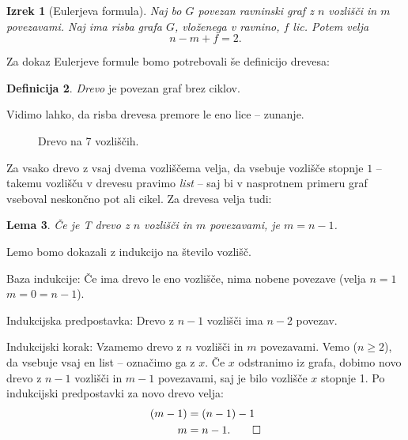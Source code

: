 \documentclass[12pt,a4paper]{amsart}
\theoremstyle{definition} %
\newtheorem{definicija}{Definicija}[section]
\theoremstyle{plain} %
\newtheorem{lema}[definicija]{Lema}
\newtheorem{izrek}[definicija]{Izrek}
\begin{document}
\begin{izrek}[Eulerjeva formula]
    \label{izr:euler-formula}
    Naj bo $G$ povezan ravninski graf z $n$ vozlišči in $m$ povezavami. Naj ima risba grafa $G$, vloženega v ravnino, $f$ lic. Potem velja
    \[ n - m + f = 2 .\]
\end{izrek}

Za dokaz Eulerjeve formule bomo potrebovali še definicijo drevesa:
\begin{definicija}
    \emph{Drevo} je povezan graf brez ciklov.
\end{definicija}
Vidimo lahko, da risba drevesa premore le eno lice -- zunanje.

\begin{figure}[h]
    
    \caption{Drevo na 7 vozliščih.}
\end{figure}

Za vsako drevo z vsaj dvema vozliščema velja, da vsebuje vozlišče stopnje $1$ -- takemu vozlišču v drevesu pravimo \emph{list} -- saj bi v nasprotnem primeru graf vseboval neskončno pot ali cikel. Za drevesa velja tudi:

\begin{lema}
    Če je T drevo z $n$ vozlišči in $m$ povezavami, je $m=n-1$.
\end{lema}

\proof
    Lemo bomo dokazali z indukcijo na število vozlišč.
    
    Baza indukcije: Če ima drevo le eno vozlišče, nima nobene povezave (velja $n = 1$ $m = 0 = n-1$).
    
    Indukcijska predpostavka: Drevo z $n-1$ vozlišči ima $n-2$ povezav.
    
    Indukcijski korak: Vzamemo drevo z $n$ vozlišči in $m$ povezavami. Vemo ($n \geq 2$), da vsebuje vsaj en list -- označimo ga z $x$. Če $x$ odstranimo iz grafa, dobimo novo drevo z $n-1$ vozlišči in $m-1$ povezavami, saj je bilo vozlišče $x$ stopnje 1. Po indukcijski predpostavki za novo drevo velja:
    \begin{align*}
        (m-1) &= (n-1) - 1 \\
        m     &= n - 1. \qedhere
    \end{align*}
\endproof
\end{document}
